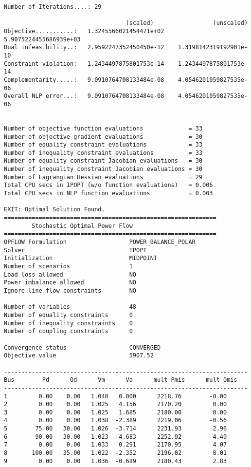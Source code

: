 \begin{lstlisting}
Number of Iterations....: 29

                                   (scaled)                 (unscaled)
Objective...........:   1.3245566021454471e+02    5.9075224455686939e+03
Dual infeasibility..:   2.9592247352450450e-12    1.3198142319192901e-10
Constraint violation:   1.2434497875801753e-14    1.2434497875801753e-14
Complementarity.....:   9.0910764708133484e-08    4.0546201059827535e-06
Overall NLP error...:   9.0910764708133484e-08    4.0546201059827535e-06


Number of objective function evaluations             = 33
Number of objective gradient evaluations             = 30
Number of equality constraint evaluations            = 33
Number of inequality constraint evaluations          = 33
Number of equality constraint Jacobian evaluations   = 30
Number of inequality constraint Jacobian evaluations = 30
Number of Lagrangian Hessian evaluations             = 29
Total CPU secs in IPOPT (w/o function evaluations)   = 0.006
Total CPU secs in NLP function evaluations           = 0.003

EXIT: Optimal Solution Found.
=============================================================
        Stochastic Optimal Power Flow
=============================================================
OPFLOW Formulation                  POWER_BALANCE_POLAR
Solver                              IPOPT
Initialization                      MIDPOINT
Number of scenarios                 1
Load loss allowed                   NO
Power imbalance allowed             NO
Ignore line flow constraints        NO

Number of variables                 48
Number of equality constraints      0
Number of inequality constraints    0
Number of coupling constraints      0

Convergence status                  CONVERGED
Objective value                     5907.52

----------------------------------------------------------------------
Bus        Pd      Qd      Vm      Va      mult_Pmis      mult_Qmis
----------------------------------------------------------------------
1         0.00    0.00   1.040   0.000      2218.76        -0.00
2         0.00    0.00   1.025   4.156      2170.20         0.00
3         0.00    0.00   1.025   1.685      2180.00         0.00
4         0.00    0.00   1.038  -2.389      2219.06        -0.56
5        75.00   30.00   1.026  -3.714      2231.93         2.96
6        90.00   30.00   1.023  -4.683      2252.92         4.40
7         0.00    0.00   1.033   0.291      2170.95         4.07
8       100.00   35.00   1.022  -2.352      2196.02         8.01
9         0.00    0.00   1.036  -0.689      2180.43         2.83


\end{lstlisting}
